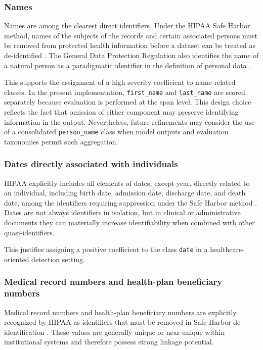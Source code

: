 \documentclass[11pt,a4paper]{article}
\begin{document}
\subsubsection{Names}

Names are among the clearest direct identifiers. Under the HIPAA Safe Harbor method, names of the subjects of the records and certain associated persons must be removed from protected health information before a dataset can be treated as de-identified \citep{hhs_hipaa_deidentification}. The General Data Protection Regulation also identifies the name of a natural person as a paradigmatic identifier in the definition of personal data \citep{eu_gdpr_2016}.

This supports the assignment of a high severity coefficient to name-related classes. In the present implementation, \texttt{first\_name} and \texttt{last\_name} are scored separately because evaluation is performed at the span level. This design choice reflects the fact that omission of either component may preserve identifying information in the output. Nevertheless, future refinements may consider the use of a consolidated \texttt{person\_name} class when model outputs and evaluation taxonomies permit such aggregation.

\subsubsection{Dates directly associated with individuals}

HIPAA explicitly includes all elements of dates, except year, directly related to an individual, including birth date, admission date, discharge date, and death date, among the identifiers requiring suppression under the Safe Harbor method \citep{hhs_hipaa_deidentification}. Dates are not always identifiers in isolation, but in clinical or administrative documents they can materially increase identifiability when combined with other quasi-identifiers.

This justifies assigning a positive coefficient to the class \texttt{date} in a healthcare-oriented detection setting.

\subsubsection{Medical record numbers and health-plan beneficiary numbers}

Medical record numbers and health-plan beneficiary numbers are explicitly recognized by HIPAA as identifiers that must be removed in Safe Harbor de-identification \citep{hhs_hipaa_deidentification}. These values are generally unique or near-unique within institutional systems and therefore possess strong linkage potential.
\end{document}

